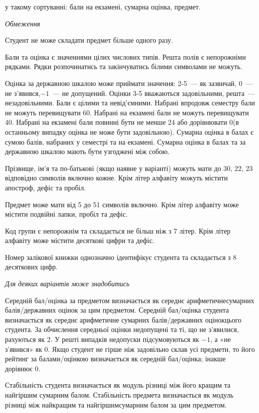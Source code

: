\documentclass[11pt, ukrainian]{article}
\begin{document}
{\noindent}у такому сортуванні: бали на екзамені, сумарна оцінка, предмет.


\bigskip\textit{Обмеження}

Студент не може складати предмет більше одного разу.

Бали та оцінка є значеннями цілих числових типів. Решта полів є непорожніми рядками.
Рядки розпочинатись та закінчуватись білими символами не можуть.

Оцінка за державною шкалою може приймати значення: 2-5~--- як зазвичай, 0~--- не з’явився,$-1$~--- не допущений. 
Оцінки 3-5 вважаються задовільними, решта~--- незадовільними. 
Бали є цілими та невід’ємними.
Набрані впродовж семестру бали не можуть перевищувати 60. 
Набрані на екзамені бали не можуть перевищувати 40. 
Набрані на екзамені бали повинні бути не менше 24 або дорівнювати 0(в останньому випадку оцінка не може бути задовільною). 
Сумарна оцінка в балах є сумою балів, набраних у семестрі та на екзамені.
Сумарна оцінка в балах та за державною шкалою мають бути узгоджені між собою.

Прізвище, ім’я та по-батькові (якщо наявне у варіанті) можуть мати до 30, 22, 23 відповідно символів включно кожне. 
Крім літер алфавіту можуть містити апостроф, дефіс та пробіл.

Предмет може мати від 5 до 51 символів включно. 
Крім літер алфавіту може містити подвійні лапки, пробіл та дефіс.

Код групи є непорожнім та складається не більш ніж з 7 літер. 
Крім літер алфавіту може містити десяткові цифри та дефіс.


Номер залікової книжки однозначно ідентифікує студента та складається з 8 десяткових цифр. 

\bigskip\textit{Для деяких варіантів може знадобитись}

Середній бал/оцінка за предметом визначається як середнє арифметичнесумарних балів/державних оцінок за цим предметом. 
Середній бал/оцінка студента визначається як середнє арифметичне сумарних балів/державних оцінокцього студента. 
За обчислення середньої оцінки недопущені та ті, що не з’явилися, рахуються як 2.
У решті випадків недопуски підсумовуються як $-1$, а «не з’явився» як 0.
Якщо студент не гірше ніж задовільно склав усі предмети, 
то його рейтинг за балами/оцінкою визначається як середній бал/оцінка; інакше дорівнює 0.

Стабільність студента визначається як модуль різниці між його кращим та найгіршим сумарним балом.
Стабільність предмета визначається як модуль різниці між найкращим та найгіршимсумарним балом за цим предметом.
\end{document}
